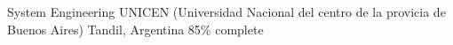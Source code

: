 \begin{cventries}
\cventry
{System Engineering} %
{UNICEN (Universidad Nacional del centro de la provicia de Buenos Aires)} %
{Tandil, Argentina} %
{ 85\% complete} %
{ %
}
\end{cventries}
